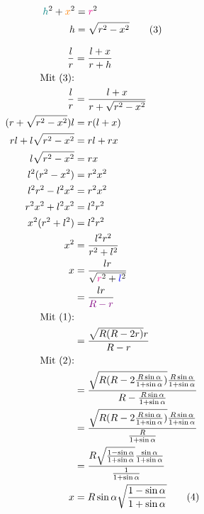 \begin{align*}
	\textcolor{teal}{h}^2 + \textcolor{orange}{x}^2 &= \textcolor{magenta}{r}^2 \\
	h &= \sqrt{r^2-x^2} \tag{3}
\end{align*}

\begin{samepage}
	\begin{align*}
		\frac{l}{r} &= \frac{l+x}{r+h} \\
		\text{Mit (3):} \\
		\frac{l}{r} &= \frac{l+x}{r+\sqrt{r^2-x^2}} \\
		(r+\sqrt{r^2-x^2})l &= r(l+x) \\
		rl + l\sqrt{r^2-x^2} &= rl+rx \\
		l\sqrt{r^2-x^2} &= rx \\
		l^2(r^2-x^2) &= r^2 x^2 \\
		l^2 r^2 - l^2 x^2 &= r^2 x^2 \\
		r^2 x^2 + l^2 x^2 &= l^2 r^2 \\
		x^2 (r^2+l^2) &= l^2 r^2 \\
		x^2 &= \frac{l^2 r^2}{r^2 + l^2} \\
		x &= \frac{lr}{\sqrt{\textcolor{magenta}{r}^2+\textcolor{blue}{l}^2}} \\
		&= \frac{lr}{\textcolor{violet}{R-r}} \\
		\text{Mit (1):} \\
		&= \frac{\sqrt{R(R-2r)}r}{R-r} \\
		\text{Mit (2):} \\
		&= \frac{\sqrt{R(R-2\frac{R\sin\alpha}{1+\sin\alpha})}\frac{R\sin\alpha}{1+\sin\alpha}}{R-\frac{R\sin\alpha}{1+\sin\alpha}} \\
		&= \frac{\sqrt{R(R-2\frac{R\sin\alpha}{1+\sin\alpha})}\frac{R\sin\alpha}{1+\sin\alpha}}{\frac{R}{1+\sin\alpha}} \\
		&= \frac{R\sqrt{\frac{1-\sin\alpha}{1+\sin\alpha}}\frac{\sin\alpha}{1+\sin\alpha}}{\frac{1}{1+\sin\alpha}} \\
		x &= R\sin\alpha\sqrt{\frac{1-\sin\alpha}{1+\sin\alpha}} \tag{4}
	\end{align*}
\end{samepage}
\goodbreak

